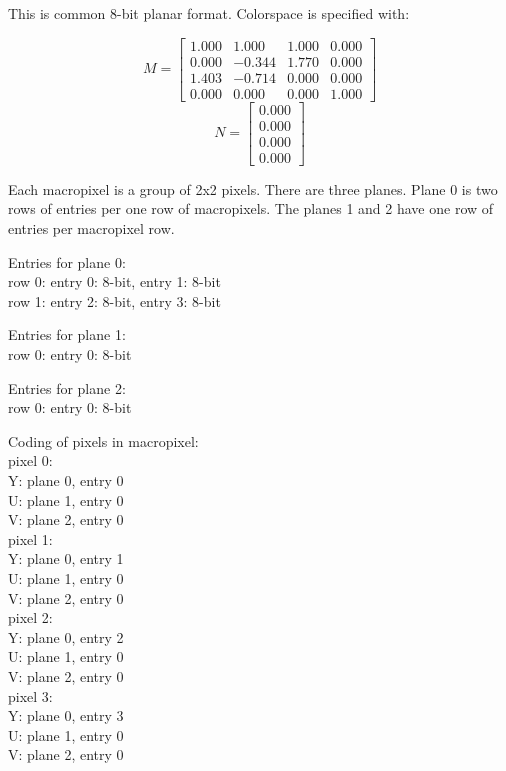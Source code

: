 This is common 8-bit planar format. Colorspace is specified with:

\begin{displaymath}
M =
  \left[ \begin{array}{ rrrr }
    1.000 & 1.000 & 1.000 & 0.000 \\
    0.000 & -0.344 & 1.770 & 0.000 \\
    1.403 & -0.714 & 0.000 & 0.000 \\
    0.000 & 0.000 & 0.000 & 1.000
  \end{array} \right]
\end{displaymath}
\begin{displaymath}
N =
  \left[ \begin{array}{ r }
    0.000 \\
    0.000 \\
    0.000 \\
    0.000
  \end{array} \right]
\end{displaymath}

Each macropixel is a group of 2x2 pixels. There are three planes. Plane 0 is two rows of entries per one row of macropixels. The planes 1 and 2 have one row of entries per macropixel row.

Entries for plane 0: \\
row 0: entry 0: 8-bit, entry 1: 8-bit \\
row 1: entry 2: 8-bit, entry 3: 8-bit

Entries for plane 1: \\
row 0: entry 0: 8-bit

Entries for plane 2: \\
row 0: entry 0: 8-bit

Coding of pixels in macropixel: \\
pixel 0: \\
Y: plane 0, entry 0 \\
U: plane 1, entry 0 \\
V: plane 2, entry 0 \\
pixel 1: \\
Y: plane 0, entry 1 \\
U: plane 1, entry 0 \\
V: plane 2, entry 0 \\
pixel 2: \\
Y: plane 0, entry 2 \\
U: plane 1, entry 0 \\
V: plane 2, entry 0 \\
pixel 3: \\
Y: plane 0, entry 3 \\
U: plane 1, entry 0 \\
V: plane 2, entry 0 \\


